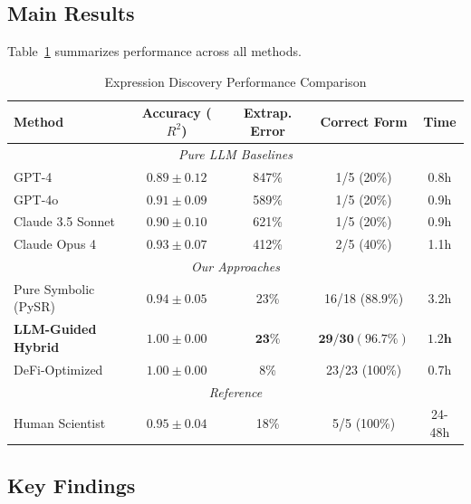 \documentclass[twoside,11pt]{article}
\begin{document}
\subsection{Main Results}

Table~\ref{tab:main_results} summarizes performance across all methods.

\begin{table}[htbp]
\centering
\caption{Expression Discovery Performance Comparison}
\label{tab:main_results}
\begin{tabular}{@{}lcccc@{}}
\toprule
\textbf{Method} & \textbf{Accuracy ($R^2$)} & \textbf{Extrap. Error} & \textbf{Correct Form} & \textbf{Time} \\
\midrule
\multicolumn{5}{c}{\textit{Pure LLM Baselines}} \\
\midrule
GPT-4 & $0.89 \pm 0.12$ & 847\% & 1/5 (20\%) & 0.8h \\
GPT-4o & $0.91 \pm 0.09$ & 589\% & 1/5 (20\%) & 0.9h \\
Claude 3.5 Sonnet & $0.90 \pm 0.10$ & 621\% & 1/5 (20\%) & 0.9h \\
Claude Opus 4 & $0.93 \pm 0.07$ & 412\% & 2/5 (40\%) & 1.1h \\
\midrule
\multicolumn{5}{c}{\textit{Our Approaches}} \\
\midrule
Pure Symbolic (PySR) & $0.94 \pm 0.05$ & 23\% & 16/18 (88.9\%) & 3.2h \\
\textbf{LLM-Guided Hybrid} & $\mathbf{1.00 \pm 0.00}$ & $\mathbf{23\%}$ & $\mathbf{29/30 (96.7\%)}$ & $\mathbf{1.2h}$ \\
DeFi-Optimized & $1.00 \pm 0.00$ & 8\% & 23/23 (100\%) & 0.7h \\
\midrule
\multicolumn{5}{c}{\textit{Reference}} \\
\midrule
Human Scientist & $0.95 \pm 0.04$ & 18\% & 5/5 (100\%) & 24-48h \\
\bottomrule
\end{tabular}
\end{table}

\subsection{Key Findings}
\end{document}
